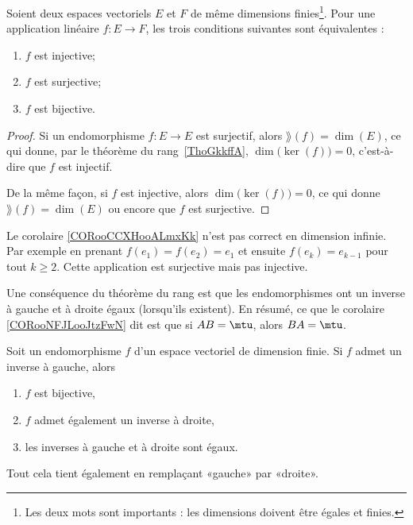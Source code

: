 \begin{corollary}       \label{CORooCCXHooALmxKk}
    Soient deux espaces vectoriels \( E\) et \( F\) de même dimensions finies\footnote{Les deux mots sont importants : les dimensions doivent être égales et finies.}. Pour une application linéaire \( f\colon E\to F\), les trois conditions suivantes sont équivalentes :
    \begin{enumerate}
        \item
            \( f\) est injective;
        \item
            \( f\) est surjective;
        \item
            \( f\) est bijective.
    \end{enumerate}
\end{corollary}

\begin{proof}
    Si un endomorphisme \( f\colon E\to E\) est surjectif, alors \( \rang(f)=\dim(E)\), ce qui donne, par le théorème du rang~\ref{ThoGkkffA}, \( \dim\big( \ker(f) \big)=0\), c'est-à-dire que \( f\) est injectif.

    De la même façon, si \( f\) est injective, alors \( \dim\big( \ker(f) \big)=0\), ce qui donne \( \rang(f)=\dim(E)\) ou encore que \( f\) est surjective.
\end{proof}

\begin{example}
    Le corolaire \ref{CORooCCXHooALmxKk} n'est pas correct en dimension infinie. Par exemple en prenant \( f(e_1)=f(e_2)=e_1\) et ensuite \( f(e_k)=e_{k-1}\) pour tout \( k\geq 2\). Cette application est surjective mais pas injective.
\end{example}

Une conséquence du théorème du rang est que les endomorphismes ont un inverse à gauche et à droite égaux (lorsqu'ils existent). En résumé, ce que le corolaire \ref{CORooNFJLooJtzFwN} dit est que si \( AB=\mtu\), alors \( BA=\mtu\).
\begin{corollary}           \label{CORooNFJLooJtzFwN}
    Soit un endomorphisme \( f\) d'un espace vectoriel de dimension finie. Si \( f\) admet un inverse à gauche, alors
    \begin{enumerate}
        \item
            \( f\) est bijective,
        \item
            \( f\) admet également un inverse à droite,
        \item
            les inverses à gauche et à droite sont égaux.
    \end{enumerate}
    Tout cela tient également en remplaçant «gauche» par «droite».
\end{corollary}

